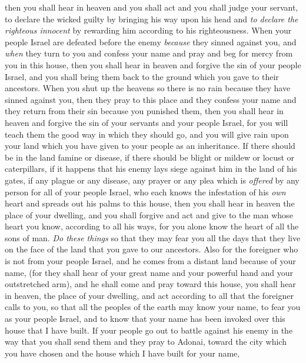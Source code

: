 \begin{biblechapter}
\verse then you shall hear in heaven and you shall act and you shall judge your servant, to declare the wicked guilty by bringing his way upon his head and \textit{to declare the righteous innocent} by rewarding him according to his righteousness.
\verse When your people Israel are defeated before the enemy \textit{because} they sinned against you, and \textit{when} they turn to you and confess your name and pray and beg for mercy from you in this house,
\verse then you shall hear in heaven and forgive the sin of your people Israel, and you shall bring them back to the ground which you gave to their ancestors.
\verse When you shut up the heavens so there is no rain because they have sinned against you, then they pray to this place and they confess your name and they return from their sin because you punished them,
\verse then you shall hear in heaven and forgive the sin of your servants and your people Israel, for you will teach them the good way in which they should go, and you will give rain upon your land which you have given to your people as an inheritance.
\verse If there should be in the land famine or disease, if there should be blight or mildew or locust or caterpillars, if it happens that his enemy lays siege against him in the land of his gates, if any plague or any disease,
\verse any prayer or any plea which is \textit{offered} by any person for all of your people Israel, who each knows the infestation of his \textit{own} heart and spreads out his palms to this house,
\verse then you shall hear in heaven the place of your dwelling, and you shall forgive and act and give to the man whose heart you know, according to all his ways, for you alone know the heart of all the sons of man.
\verse \textit{Do these things} so that they may fear you all the days that they live on the face of the land that you gave to our ancestors.
\verse Also for the foreigner who is not from your people Israel, and he comes from a distant land because of your name,
\verse (for they shall hear of your great name and your powerful hand and your outstretched arm), and he shall come and pray toward this house,
\verse you shall hear in heaven, the place of your dwelling, and act according to all that the foreigner calls to you, so that all the peoples of the earth may know your name, to fear you as your people Israel, and to know that your name has been invoked over this house that I have built.
\verse If your people go out to battle against his enemy in the way that you shall send them and they pray to Adonai, toward the city which you have chosen and the house which I have built for your name,

\end{biblechapter}
